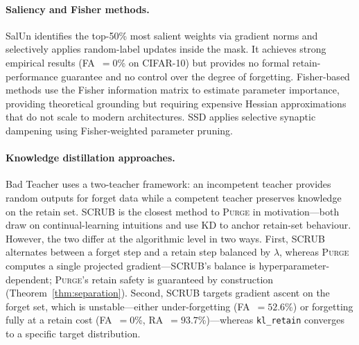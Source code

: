 \documentclass[letterpaper]{article} %
\newcommand{\ours}{\textsc{Purge}}
\newcommand{\klr}{\texttt{kl\_retain}}
\begin{document}
\paragraph{Saliency and Fisher methods.}
SalUn \citep{fan2024salun} identifies the top-50\% most salient weights via gradient norms and selectively applies random-label updates inside the mask.
It achieves strong empirical results (FA~$= 0$\% on CIFAR-10) but provides no formal retain-performance guarantee and no control over the degree of forgetting.
Fisher-based methods \citep{golatkar2020eternal,golatkar2021scrubbing} use the Fisher information matrix to estimate parameter importance, providing theoretical grounding but requiring expensive Hessian approximations that do not scale to modern architectures.
SSD \citep{foster2024ssd} applies selective synaptic dampening using Fisher-weighted parameter pruning.

\paragraph{Knowledge distillation approaches.}
Bad Teacher \citep{chundawat2023badteacher} uses a two-teacher framework: an incompetent teacher provides random outputs for forget data while a competent teacher preserves knowledge on the retain set.
SCRUB \citep{kurmanji2023unbounded} is the closest method to \ours{} in motivation---both draw on continual-learning intuitions and use KD to anchor retain-set behaviour.
However, the two differ at the algorithmic level in two ways.
First, SCRUB alternates between a forget step and a retain step balanced by $\lambda$, whereas \ours{} computes a single projected gradient---SCRUB's balance is hyperparameter-dependent; \ours{}'s retain safety is guaranteed by construction (Theorem~\ref{thm:separation}).
Second, SCRUB targets gradient ascent on the forget set, which is unstable---either under-forgetting (FA~$= 52.6$\%) or forgetting fully at a retain cost (FA~$= 0$\%, RA~$= 93.7$\%)---whereas \klr{} converges to a specific target distribution.
\end{document}
